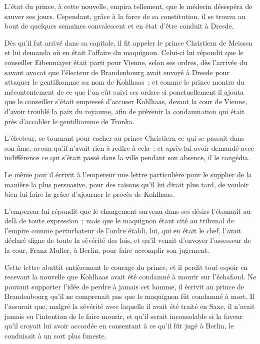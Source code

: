 \documentclass[french,twoside]{book} %
\begin{document}
L’état du prince, à cette nouvelle, empira tellement, que le médecin désespéra de sauver ses jours. Cependant, grâce à la force de sa constitution, il se trouva au bout de quelques semaines convalescent et en état d’être conduit à Dresde.\par
Dès qu’il fut arrivé dans sa capitale, il fit appeler le prince Christiern de Meissen et lui demanda où en était l’affaire du maquignon. Celui-ci lui répondit que le conseiller Eibenmayer était parti pour Vienne, selon ses ordres, dès l’arrivée du savant avocat que l’électeur de Brandenbourg avait envoyé à Dresde pour attaquer le gentilhomme au nom de Kohlhaas ; et comme le prince montra du mécontentement de ce que l’on eût suivi ses ordres si ponctuellement il ajouta que le conseiller s’était empressé d’accuser Kohlhaas, devant la cour de Vienne, d’avoir troublé la paix du royaume, afin de prévenir la condamnation qui était près d’accabler le gentilhomme de Tronka.\par
L’électeur, se tournant pour cacher au prince Christiern ce qui se passait dans son âme, avoua qu’il n’avait rien à redire à cela ; et après lui avoir demandé avec indifférence ce qui s’était passé dans la ville pendant son absence, il le congédia.\par
Le même jour il écrivit à l’empereur une lettre particulière pour le supplier de la manière la plus persuasive, pour des raisons qu’il lui dirait plus tard, de vouloir bien lui faire la grâce d’ajourner le procès de Kohlhaas.\par
L’empereur lui répondit que le changement survenu dans ses désirs l’étonnait au-delà de toute expression ; mais que le maquignon étant cité au tribunal de l’empire comme perturbateur de l’ordre établi, lui, qui en était le chef, l’avait déclaré digne de toute la sévérité des lois, et qu’il venait d’envoyer l’assesseur de la cour, Franz Muller, à Berlin, pour faire accomplir son jugement.\par
Cette lettre abattit entièrement le courage du prince, et il perdit tout espoir en recevant la nouvelle que Kohlhaas avait été condamné à mourir sur l’échafaud. Ne pouvant supporter l’idée de perdre à jamais cet homme, il écrivit au prince de Brandenbourg qu’il ne comprenait pas que le maquignon fût condamné à mort. Il l’assurait que, malgré la sévérité avec laquelle il avait été traité en Saxe, il n’avait jamais eu l’intention de le faire mourir, et qu’il serait inconsolable si la faveur qu’il croyait lui avoir accordée en consentant à ce qu’il fût jugé à Berlin, le conduisait à un sort plus funeste.\par
\end{document}
